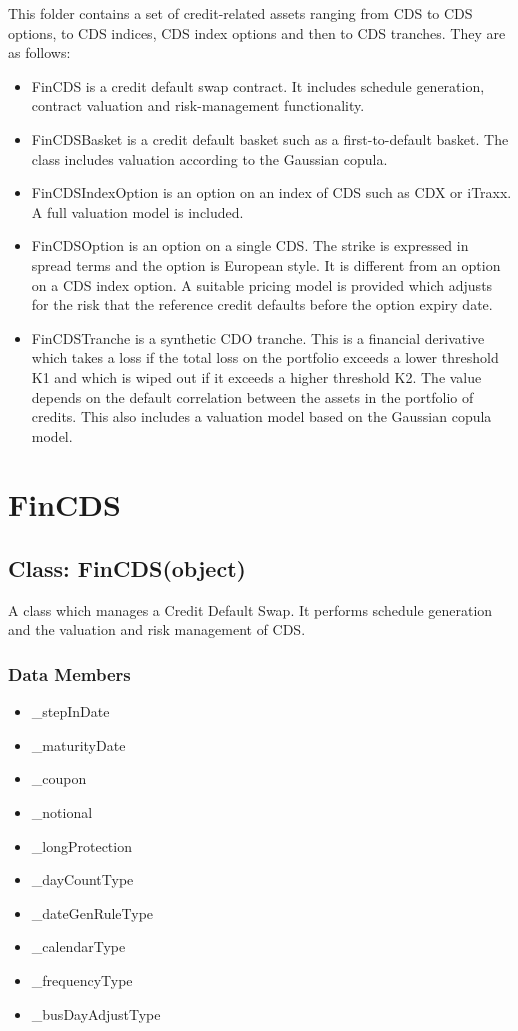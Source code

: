\documentclass[twoside,11pt]{book}
\begin{document}
This folder contains a set of credit-related assets ranging from CDS to CDS options, to CDS indices, CDS index options and then to CDS tranches. They are as follows:
\begin{itemize}
\item{ FinCDS is a credit default swap contract. It includes schedule generation, contract valuation and risk-management functionality.
}
\item{ FinCDSBasket is a credit default basket such as a first-to-default basket. The class includes valuation according to the Gaussian copula.
}
\item{ FinCDSIndexOption is an option on an index of CDS such as CDX or iTraxx. A full valuation model is included.
}
\item{ FinCDSOption is an option on a single CDS. The strike is expressed in spread terms and the option is European style. It is different from an option on a CDS index option. A suitable pricing model is provided which adjusts for the risk that the reference credit defaults before the option expiry date.
}
\item{ FinCDSTranche is a synthetic CDO tranche. This is a financial derivative which takes a loss if the total loss on the portfolio exceeds a lower threshold K1 and which is wiped out if it exceeds a higher threshold K2. The value depends on the default correlation between the assets in the portfolio of credits. This also includes a valuation model based on the Gaussian copula model.
}
\end{itemize}
\newpage
\section{FinCDS}

\subsection*{Class: FinCDS(object)}
A class which manages a Credit Default Swap. It performs schedule generation and the valuation and risk management of CDS.  

\subsubsection*{Data Members}
\begin{itemize}
\item{\_stepInDate}
\item{\_maturityDate}
\item{\_coupon}
\item{\_notional}
\item{\_longProtection}
\item{\_dayCountType}
\item{\_dateGenRuleType}
\item{\_calendarType}
\item{\_frequencyType}
\item{\_busDayAdjustType}
\end{itemize}
\end{document}
